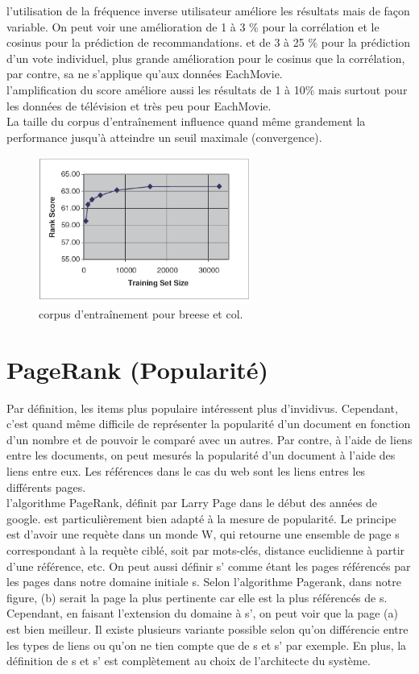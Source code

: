 \documentclass[oneside]{book}
\begin{document}
l'utilisation de la fréquence inverse utilisateur améliore les résultats mais de façon variable. On peut voir une amélioration de 1 à 3 \% pour la corrélation et le cosinus pour la prédiction de recommandations. et de 3 à 25 \% pour la prédiction d'un vote individuel, plus grande amélioration pour le cosinus que la corrélation, par contre, sa ne s'applique qu'aux données EachMovie.\\

l'amplification du score améliore aussi les résultats de 1 à 10\% mais surtout pour les données de télévision et très peu pour EachMovie.\\

La taille du corpus d'entraînement influence quand même grandement la performance jusqu'à atteindre un seuil maximale (convergence).\\

\begin{figure}[!ht]
\centering
\includegraphics[width = 7cm]{corpus.png}
\caption{corpus d'entraînement pour breese et col.}
\label{fig:corpus}
\end{figure}


\section{PageRank (Popularité)}
Par définition, les items plus populaire intéressent plus d'invidivus. Cependant, c'est quand même difficile de représenter la popularité d'un document en fonction d'un nombre et de pouvoir le comparé avec un autres. Par contre, à l'aide de liens entre les documents, on peut mesurés la popularité d'un document à l'aide des liens entre eux. Les références dans le cas du web sont les liens entres les différents pages. \\

l'algorithme PageRank, définit par Larry Page dans le début des années de google. est particulièrement bien adapté à la mesure de popularité. Le principe est d'avoir une requète dans un monde W, qui retourne une ensemble de page s correspondant à la requète ciblé, soit par mots-clés, distance euclidienne à partir d'une référence, etc. On peut aussi définir s' comme étant les pages référencés par les pages dans notre domaine initiale s. Selon l'algorithme Pagerank, dans notre figure, (b) serait la page la plus pertinente car elle est la plus référencés de s. Cependant, en faisant l'extension du domaine à s', on peut voir que la page (a) est bien meilleur. Il existe plusieurs variante possible selon qu'on différencie entre les types de liens ou qu'on ne tien compte que de s et s' par exemple. En plus, la définition de s et s' est complètement au choix de l'architecte du système.\\
\end{document}
